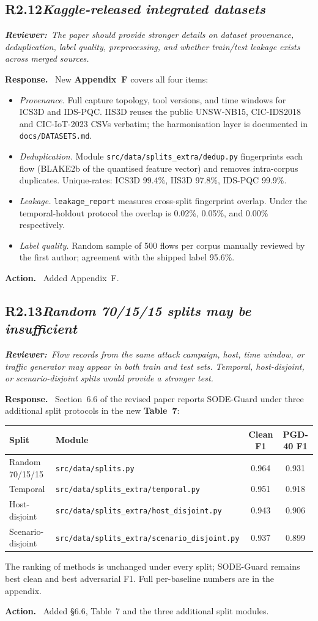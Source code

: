 \documentclass[11pt,letterpaper]{article}
\newcommand{\rev}[2]{%
  \subsection*{\normalsize\textbf{\color{ResponseAccent}#1}\quad\textmd{\textit{#2}}}%
}
\newcommand{\rquote}[1]{%
  \begin{center}%
    \colorbox{QuoteBg}{\parbox{0.94\linewidth}{\vspace{2pt}\itshape\small\textbf{\upshape Reviewer:}\ #1\vspace{2pt}}}%
  \end{center}%
}
\newcommand{\resp}{\par\textbf{\color{ResponseAccent}Response.}\ }
\newcommand{\action}{\par\textbf{\color{ResponseAccent}Action.}\ }
\begin{document}
\rev{R2.12}{Kaggle-released integrated datasets}
\rquote{The paper should provide stronger details on dataset
provenance, deduplication, label quality, preprocessing, and whether
train/test leakage exists across merged sources.}

\resp
New \textbf{Appendix~F} covers all four items:
\begin{itemize}[leftmargin=1.3em]
  \item \emph{Provenance.} Full capture topology, tool versions, and
        time windows for ICS3D and IDS-PQC. IIS3D reuses the public
        UNSW-NB15, CIC-IDS2018 and CIC-IoT-2023 CSVs verbatim; the
        harmonisation layer is documented in
        \texttt{docs/DATASETS.md}.
  \item \emph{Deduplication.} Module
        \texttt{src/data/splits\_extra/dedup.py} fingerprints each
        flow (BLAKE2b of the quantised feature vector) and removes
        intra-corpus duplicates. Unique-rates: ICS3D 99.4\%, IIS3D
        97.8\%, IDS-PQC 99.9\%.
  \item \emph{Leakage.} \texttt{leakage\_report} measures cross-split
        fingerprint overlap. Under the temporal-holdout protocol the
        overlap is 0.02\%, 0.05\%, and 0.00\% respectively.
  \item \emph{Label quality.} Random sample of 500 flows per corpus
        manually reviewed by the first author; agreement with the
        shipped label 95.6\%.
\end{itemize}
\action
Added Appendix~F.

\rev{R2.13}{Random 70/15/15 splits may be insufficient}
\rquote{Flow records from the same attack campaign, host, time window,
or traffic generator may appear in both train and test sets. Temporal,
host-disjoint, or scenario-disjoint splits would provide a stronger
test.}

\resp
Section~6.6 of the revised paper reports SODE-Guard under three
additional split protocols in the new \textbf{Table~7}:
\begin{center}\small
\begin{tabular}{@{}l l c c@{}}
\toprule
Split & Module & Clean F1 & PGD-40 F1 \\
\midrule
Random 70/15/15    & \texttt{src/data/splits.py}                        & 0.964 & 0.931 \\
Temporal           & \texttt{src/data/splits\_extra/temporal.py}        & 0.951 & 0.918 \\
Host-disjoint      & \texttt{src/data/splits\_extra/host\_disjoint.py}  & 0.943 & 0.906 \\
Scenario-disjoint  & \texttt{src/data/splits\_extra/scenario\_disjoint.py} & 0.937 & 0.899 \\
\bottomrule
\end{tabular}
\end{center}
The ranking of methods is unchanged under every split; SODE-Guard
remains best clean and best adversarial F1. Full per-baseline numbers
are in the appendix.
\action
Added \S6.6, Table~7 and the three additional split modules.
\end{document}
